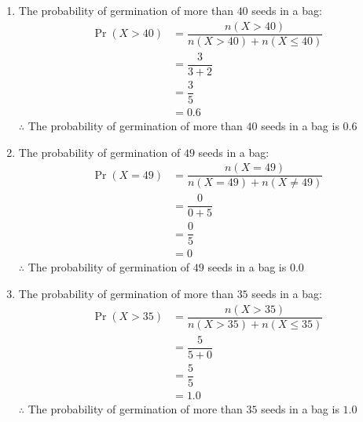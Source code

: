 \documentclass[journal,12pt,twocolumn]{IEEEtran}
\providecommand{\pr}[1]{\ensuremath{\Pr\left(#1\right)}}
\begin{document}
	\begin{enumerate}[label=(\roman*)]
    \item The probability of germination of more than $40$ seeds in a bag:
	\begin{align}
	\pr{X > 40} &= \dfrac{n(X>40)}{n(X>40) + n(X\le40)} \\
	&= \dfrac{3}{3+2} \\
	&= \dfrac{3}{5} \\
	&= 0.6
	\end{align}
	$\therefore$ The probability of germination of more than $40$ seeds in a bag is $0.6$
	
	\item The probability of germination of $49$ seeds in a bag:
	\begin{align}
	\pr{X = 49} &= \dfrac{n(X=49)}{n(X=49) + n(X \neq 49)} \\
	&= \dfrac{0}{0+5} \\
	&= \dfrac{0}{5}   \\
	&= 0
	\end{align}
	$\therefore$ The probability of germination of $49$ seeds in a bag is $0.0$
	
	\item The probability of germination of more than $35$ seeds in a bag:
	\begin{align}
	\pr{X > 35} &= \dfrac{n(X>35)}{n(X>35) + n(X\le35)} \\
	&= \dfrac{5}{5+0} \\
	&= \dfrac{5}{5}  \\
	&= 1.0
	\end{align}
	$\therefore$ The probability of germination of more than $35$ seeds in a bag is $1.0$
	
	\end{enumerate}
	
\end{document}
